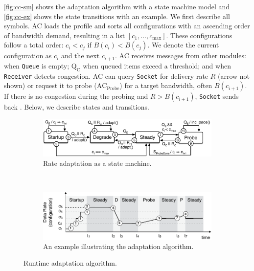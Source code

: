 \autoref{fig:cc-sm} shows the adaptation algorithm with a state machine model
and \autoref{fig:cc-ex} shows the state transitions with an example. We first
describe all symbols. AC loads the profile and sorts all configurations with an
ascending order of bandwidth demand, resulting in a list
$[c_1, \dots, c_{\max}]$.  These configurations follow a total order:
$c_i < c_j$ if $B(c_i) < B(c_j)$.  We denote the current configuration as $c_i$
and the next $c_{i+1}$.  AC receives messages from other modules: \qe{} when
\texttt{Queue} is empty; $\text{Q}_\text{C}$ when queued items exceed a
threshold; and \rc{} when \texttt{Receiver} detects congestion. AC can query
\texttt{Socket} for delivery rate $R$ (arrow not shown) or request it to probe
($\text{AC}_{\text{Probe}}$) for a target bandwidth, often $B(c_{i+1})$. If
there is no congestion during the probing and $R > B(c_{i+1})$, \texttt{Socket}
sends back \spd{}. Below, we describe states and transitions.

\begin{figure}
  \begin{subfigure}[t]{\columnwidth}
    \centering
    \includegraphics[width=\columnwidth]{figures/cc.pdf}
    \caption{Rate adaptation as a state machine.}
    \vspace{1em}
    \label{fig:cc-sm}
  \end{subfigure}
  \\
  \centering
  \begin{subfigure}[t]{\columnwidth}
    \centering
    \includegraphics[width=0.9\columnwidth]{figures/cc2.pdf}
    \caption{An example illustrating the adaptation algorithm.}
    \label{fig:cc-ex}
  \end{subfigure}
  \caption{Runtime adaptation algorithm.}
  \label{fig:cc}
  \vspace{-1em}
\end{figure}

